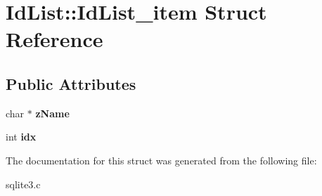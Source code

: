 \hypertarget{struct_id_list_1_1_id_list__item}{\section{Id\-List\-:\-:Id\-List\-\_\-item Struct Reference}
\label{struct_id_list_1_1_id_list__item}
}
\subsection*{Public Attributes}
\begin{DoxyCompactItemize}
\item 
\hypertarget{struct_id_list_1_1_id_list__item_acd44e1182dc46441939cd6a5d935724c}{char $\ast$ {\bfseries z\-Name}}\label{struct_id_list_1_1_id_list__item_acd44e1182dc46441939cd6a5d935724c}

\item 
\hypertarget{struct_id_list_1_1_id_list__item_a869d1a5ee03bcb018e38fae6c9ac0572}{int {\bfseries idx}}\label{struct_id_list_1_1_id_list__item_a869d1a5ee03bcb018e38fae6c9ac0572}

\end{DoxyCompactItemize}


The documentation for this struct was generated from the following file\-:\begin{DoxyCompactItemize}
\item 
sqlite3.\-c\end{DoxyCompactItemize}
